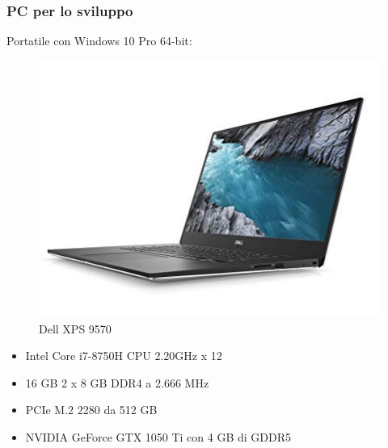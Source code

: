 \documentclass[twoside]{supsistudent}
\begin{document}
\subsubsection{PC per lo sviluppo}
Portatile con Windows 10 Pro 64-bit:
\begin{figure}[H]
  \center
  \includegraphics[scale=0.4]{images/pc.jpg}
  \caption{Dell XPS 9570}
\end{figure}
\begin{itemize}
  \item Intel Core i7-8750H CPU 2.20GHz x 12
  \item 16 GB 2 x 8 GB DDR4 a 2.666 MHz
  \item PCIe M.2 2280 da 512 GB
  \item NVIDIA GeForce GTX 1050 Ti con 4 GB di GDDR5
\end{itemize}
\end{document}
